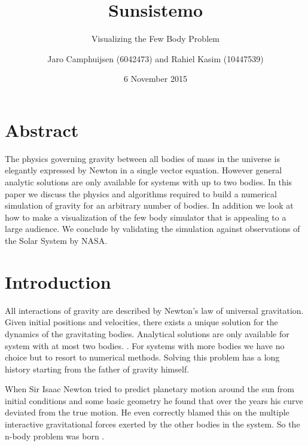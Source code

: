 \documentclass[a4paper]{article}
\author{Jaro Camphuijsen (6042473) and Rahiel Kasim (10447539)}
\date{6 November 2015}
\title{Sunsistemo}
\subtitle{Visualizing the Few Body Problem}
\begin{document}
\maketitle

\tableofcontents

\section*{Abstract}
The physics governing gravity between all bodies of mass in the universe is elegantly expressed by
Newton in a single vector equation. However general analytic solutions are only available for
systems with up to two bodies. In this paper we discuss the physics and algorithms required to build
a numerical simulation of gravity for an arbitrary number of bodies. In addition we look at how to
make a visualization of the few body simulator that is appealing to a large audience. We conclude by
validating the simulation against observations of the Solar System by NASA.

\newpage
\section{Introduction}


All interactions of gravity are described by Newton's law of universal gravitation. Given initial
positions and velocities, there exists a unique solution for the dynamics of the gravitating bodies.
Analytical solutions are only available for system with at most two bodies. \cite{scholar:nbody}.
For systems with more bodies we have no choice but to resort to numerical methods. Solving this
problem has a long history starting from the father of gravity himself.

When Sir Isaac Newton tried to predict planetary motion around the sun from initial conditions and
some basic geometry he found that over the years his curve deviated from the true motion. He even
correctly blamed this on the multiple interactive gravitational forces exerted by the other bodies
in the system. So the n-body problem was born \cite{wiki:n-body-problem}.
\end{document}
